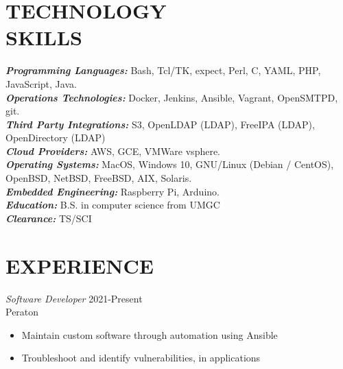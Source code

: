 \documentclass[margin, 10pt]{res} %
\begin{document}
\begin{resume}


\section{TECHNOLOGY \\ SKILLS}

{\sl \textbf{Programming Languages:}} Bash, Tcl/TK, expect, Perl, C, YAML, PHP, JavaScript, Java. \\
{\sl \textbf{Operations Technologies:}} Docker, Jenkins, Ansible, Vagrant, OpenSMTPD, git. \\
{\sl \textbf{Third Party Integrations:}} S3, OpenLDAP (LDAP), FreeIPA (LDAP), OpenDirectory (LDAP) \\
{\sl \textbf{Cloud Providers:}} AWS, GCE, VMWare vsphere. \\
{\sl \textbf{Operating Systems:}} MacOS, Windows 10, GNU/Linux (Debian / CentOS), OpenBSD, NetBSD, FreeBSD, AIX, Solaris. \\
{\sl \textbf{Embedded Engineering:}} Raspberry Pi, Arduino. \\
{\sl \textbf{Education:}} B.S. in computer science from UMGC\\
{\sl \textbf{Clearance:}} TS/SCI \\


\section{EXPERIENCE}
{\sl Software Developer } \hfill 2021-Present \\
Peraton
\begin{itemize}
  \item Maintain custom software through automation using Ansible
  \item Troubleshoot and identify vulnerabilities, in applications
\end{itemize}


\end{resume}
\end{document}

